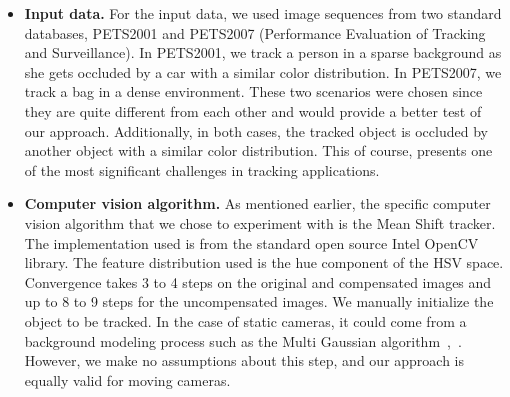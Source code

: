 \documentclass{article}
\begin{document}
\begin{itemize}
\begin{itemize}
\item \textbf{Input data.}  For the input data, we used image sequences from two standard databases, PETS2001 and PETS2007 (Performance Evaluation of Tracking and Surveillance).  In PETS2001, we track a person in a sparse background as she gets occluded by a car with a similar color distribution.  In PETS2007, we track a bag in a dense environment.  These two scenarios were chosen since they are quite different from each other and would provide a better test of our approach.  Additionally, in both cases, the tracked object is occluded by another object with a similar color distribution.  This of course, presents one of the most significant challenges in tracking applications.   
\item \textbf{Computer vision algorithm.}  As mentioned earlier, the specific computer vision algorithm that we chose to experiment with is the Mean Shift tracker.  The implementation used is from the standard open source Intel OpenCV library.  The feature distribution used is the hue component of the HSV space.  Convergence takes 3 to 4 steps on the original and compensated images and up to 8 to 9 steps for the uncompensated images.  We manually initialize the object to be tracked.  In the case of static cameras, it could come from a background modeling process such as the Multi Gaussian algorithm~\cite{2000_JNL_MG_Stauffer},~\cite{2005_JNL_SURVEYchangeDetection_Radke}.  However, we make no assumptions about this step, and our approach is equally valid for moving cameras. 

			\begin{figure}[t]
				\centering
				
					
					

\end{figure}
\end{itemize}
\end{itemize}
\end{document}
